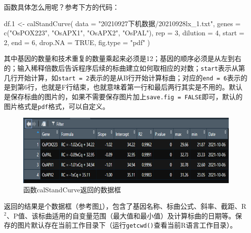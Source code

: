 \documentclass[
  10pt,
]{book}
\newenvironment{Shaded}{\begin{snugshade}}{\end{snugshade}}
\newcommand{\AttributeTok}[1]{\textcolor[rgb]{0.77,0.63,0.00}{#1}}
\newcommand{\ConstantTok}[1]{\textcolor[rgb]{0.00,0.00,0.00}{#1}}
\newcommand{\DecValTok}[1]{\textcolor[rgb]{0.00,0.00,0.81}{#1}}
\newcommand{\FloatTok}[1]{\textcolor[rgb]{0.00,0.00,0.81}{#1}}
\newcommand{\FunctionTok}[1]{\textcolor[rgb]{0.00,0.00,0.00}{#1}}
\newcommand{\NormalTok}[1]{#1}
\newcommand{\OtherTok}[1]{\textcolor[rgb]{0.56,0.35,0.01}{#1}}
\newcommand{\StringTok}[1]{\textcolor[rgb]{0.31,0.60,0.02}{#1}}
\begin{document}
函数具体怎么用呢？参考下方的代码：

\begin{Shaded}
\begin{Highlighting}[]
\NormalTok{df}\FloatTok{.1} \OtherTok{\textless{}{-}} \FunctionTok{calStandCurve}\NormalTok{(}
  \AttributeTok{data =} \StringTok{"20210927下机数据/20210928lx\_1.txt"}\NormalTok{,}
  \AttributeTok{genes =} \FunctionTok{c}\NormalTok{(}\StringTok{"OsPOX223"}\NormalTok{, }\StringTok{"OsAPX1"}\NormalTok{, }\StringTok{"OsAPX2"}\NormalTok{, }\StringTok{"OsPAL"}\NormalTok{),}
  \AttributeTok{rep =} \DecValTok{3}\NormalTok{,}
  \AttributeTok{dilution =} \DecValTok{4}\NormalTok{,}
  \AttributeTok{start =} \DecValTok{2}\NormalTok{,}
  \AttributeTok{end =} \DecValTok{6}\NormalTok{,}
  \AttributeTok{drop.NA =} \ConstantTok{TRUE}\NormalTok{,}
  \AttributeTok{fig.type =} \StringTok{"pdf"}
\NormalTok{)}
\end{Highlighting}
\end{Shaded}

其中基因的数量和技术重复的数量乘起来必须是12；基因的顺序必须是从左到右的；输入稀释倍数后告诉程序后续的标曲建立如何取相应的对数；\texttt{start}表示从第几行开始计算，如\texttt{start\ =\ 2}表示的是从B行开始计算标曲；对应的\texttt{end\ =\ 6}表示的是到第6行，也就是F行结束，也就意味着第一行和最后两行其实是不用的。默认是保存标曲的图片的，如果不需要保存图片加上\texttt{save.fig\ =\ FALSE}即可，默认的图片格式是\texttt{pdf}格式，可以自定义。

\begin{figure}

{\centering \includegraphics[width=8.14in]{figures/pac4xiang使用说明/3} 

}

\caption{函数calStandCurve返回的数据框}\label{fig:qPCR2}
\end{figure}

返回的结果是个数据框（参考图\ref{fig:qPCR2}），包含了基因名称、标曲公式、斜率、截距、R\(^2\)、P值、该标曲适用的自变量范围（最大值和最小值）及计算标曲的日期等。保存的图片默认存在当前工作目录下（运行\texttt{getcwd()}查看当前R语言工作目录）。
\end{document}
